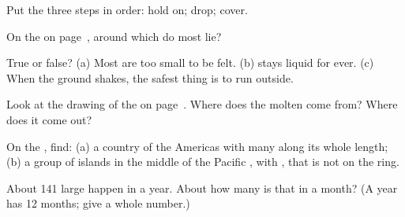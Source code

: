 \begin{exercise}[$\star$]\label{exo:g4:volcanoes-earthquakes-first-look:3}
Put the three steps in order: hold on; drop; cover.
\end{exercise}

\begin{exercise}[$\star$]\label{exo:g4:volcanoes-earthquakes-first-look:4}
On the  on page~\pageref{fig:g4:volcanoes-earthquakes-first-look:map}, around
which  do most  lie?
\end{exercise}

\begin{exercise}[$\star$]\label{exo:g4:volcanoes-earthquakes-first-look:5}
True or false? (a) Most  are too small to be felt. (b) 
stays liquid for ever. (c) When the ground shakes, the safest thing is to
run outside.
\end{exercise}

\begin{exercise}[$\star$]\label{exo:g4:volcanoes-earthquakes-first-look:6}
Look at the drawing of the  on page~\pageref{fig:g4:volcanoes-earthquakes-first-look:volcano}.
Where does the molten  come from? Where does it come out?
\end{exercise}

\begin{exercise}[$\star\star$]\label{exo:g4:volcanoes-earthquakes-first-look:7}
On the , find: (a) a country of the Americas with many  along
its whole length; (b) a group of islands in the middle of the Pacific
, with , that is not on the ring.
\end{exercise}

\begin{exercise}[$\star\star$]\label{exo:g4:volcanoes-earthquakes-first-look:8}
About 141 large  happen in a year. About how many is that in a
month? (A year has 12 months; give a whole number.)
\end{exercise}

